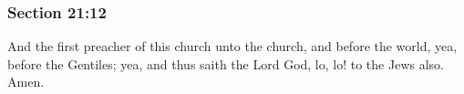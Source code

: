 	\subsubsection{Section 21:12} %
		\label{DC21-12}

		And the first preacher of this church unto the church, and before the world, yea, before the Gentiles; yea, and thus saith the Lord God, lo, lo! to the Jews also. Amen.

